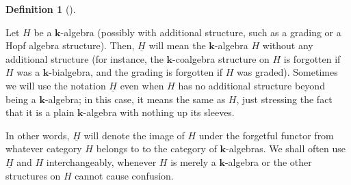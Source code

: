 \documentclass
[numbers=enddot,12pt,final,onecolumn,notitlepage,abstracton]{scrartcl}%
\theoremstyle{definition}
\newtheorem{defi}[theo]{Definition}
\newenvironment{definition}[1][]
{\begin{defi}[#1]\begin{leftbar}}
{\end{leftbar}\end{defi}}
\begin{document}
\begin{definition}
\label{def.forget}Let $H$ be a $\mathbf{k}$-algebra (possibly with additional
structure, such as a grading or a Hopf algebra structure). Then,
$\underline{H}$ will mean the $\mathbf{k}$-algebra $H$ without any additional
structure (for instance, the $\mathbf{k}$-coalgebra structure on $H$ is
forgotten if $H$ was a $\mathbf{k}$-bialgebra, and the grading is forgotten if
$H$ was graded). Sometimes we will use the notation $\underline{H}$ even when
$H$ has no additional structure beyond being a $\mathbf{k}$-algebra; in this case, it
means the same as $H$, just stressing the fact that it is a plain $\mathbf{k}%
$-algebra with nothing up its sleeves.

In other words, $\underline{H}$ will denote the image of $H$ under the
forgetful functor from whatever category $H$ belongs to to the category of
$\mathbf{k}$-algebras. We shall often use $\underline{H}$ and $H$
interchangeably, whenever $H$ is merely a $\mathbf{k}$-algebra or the other
structures on $H$ cannot cause confusion.
\end{definition}
\end{document}
